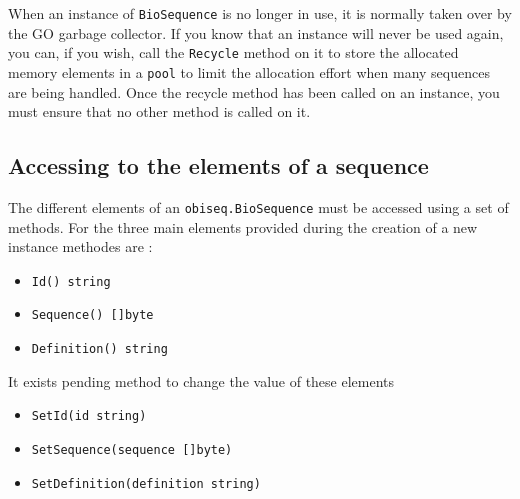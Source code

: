 \documentclass[
  letterpaper,
  DIV=11,
  numbers=noendperiod]{scrreprt}
\providecommand{\tightlist}{%
  \setlength{\itemsep}{0pt}\setlength{\parskip}{0pt}}\usepackage{longtable,booktabs,array}
\begin{document}
When an instance of \texttt{BioSequence} is no longer in use, it is
normally taken over by the GO garbage collector. If you know that an
instance will never be used again, you can, if you wish, call the
\texttt{Recycle} method on it to store the allocated memory elements in
a \texttt{pool} to limit the allocation effort when many sequences are
being handled. Once the recycle method has been called on an instance,
you must ensure that no other method is called on it.

\hypertarget{accessing-to-the-elements-of-a-sequence}{%
\subsection*{Accessing to the elements of a
sequence}\label{accessing-to-the-elements-of-a-sequence}}

The different elements of an \texttt{obiseq.BioSequence} must be
accessed using a set of methods. For the three main elements provided
during the creation of a new instance methodes are :

\begin{itemize}
\tightlist
\item
  \texttt{Id()\ string}
\item
  \texttt{Sequence()\ {[}{]}byte}
\item
  \texttt{Definition()\ string}
\end{itemize}

It exists pending method to change the value of these elements

\begin{itemize}
\tightlist
\item
  \texttt{SetId(id\ string)}
\item
  \texttt{SetSequence(sequence\ {[}{]}byte)}
\item
  \texttt{SetDefinition(definition\ string)}
\end{itemize}
\end{document}
